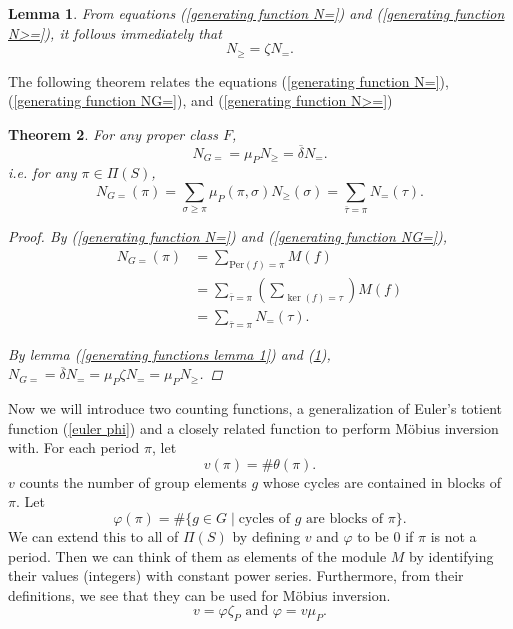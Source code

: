 \documentclass[psamsfonts]{amsart}
\newtheorem{thm}{Theorem}[section]
\newtheorem{lem}[thm]{Lemma}
\theoremstyle{definition}
\theoremstyle{remark}
\numberwithin{equation}{section}
\begin{document}
\begin{lem}\label{generating functions lemma 2}
From equations (\ref{generating function N=}) and (\ref{generating function N>=}), it follows immediately that
\begin{equation}
    N_{\geq}=\zeta N_{=}.
\end{equation}
\end{lem}
The following theorem relates the equations (\ref{generating function N=}), (\ref{generating function NG=}), and (\ref{generating function N>=})

\begin{thm}\label{theorem 1}
For any proper class $F$, 
\begin{equation}
    N_{G=}=\mu_P N_{\geq}= \overline{\delta} N_{=}.
\end{equation}
i.e. for any $\pi\in \Pi(S)$, 
\begin{equation}
    N_{G=}(\pi)=\sum_{\sigma\geq\pi}\mu_P(\pi,\sigma)N_{\geq}(\sigma)=\sum_{\overline{\tau}=\pi} N_{=}(\tau).
\end{equation}
\begin{proof}
By (\ref{generating function N=}) and (\ref{generating function NG=}),
\begin{align*}
    N_{G=}(\pi) &= \sum_{\text{Per}(f)=\pi}M(f)\\
    &=\sum_{\overline{\tau}=\pi}\left(\sum_{\ker(f)=\tau}\right)M(f)\\
    &=\sum_{\overline{\tau}=\pi}N_{=}(\tau).
\end{align*}

By lemma (\ref{generating functions lemma 1}) and (\ref{generating functions lemma 2}), $N_{G=}=\overline{\delta} N_{=} = \mu_P \zeta N_{=} = \mu_P N_{\geq}$. 
\end{proof}
\end{thm}

Now we will introduce two counting functions, a generalization of Euler's totient function (\ref{euler phi}) and a closely related function to perform M\"{o}bius inversion with.
For each period $\pi$, let
\begin{equation}\label{v function}
    v(\pi)=\#\theta(\pi).
\end{equation}
$v$ counts the number of group elements $g$ whose cycles are contained in blocks of $\pi$. Let
\begin{equation}
    \varphi(\pi)=\#\{g\in G \mid \text{cycles of $g$ are blocks of $\pi$}\}.
\end{equation}
\indent We can extend this to all of $\Pi(S)$ by defining $v$ and $\varphi$ to be $0$ if $\pi$ is not a period. Then we can think of them as elements of the module $M$ by identifying their values (integers) with constant power series. Furthermore, from their definitions, we see that they can be used for M\"{o}bius inversion.
\begin{equation}\label{v phi equation}
    v=\varphi \zeta_P \text{ and } \varphi = v \mu_P.
\end{equation}
\end{document}
